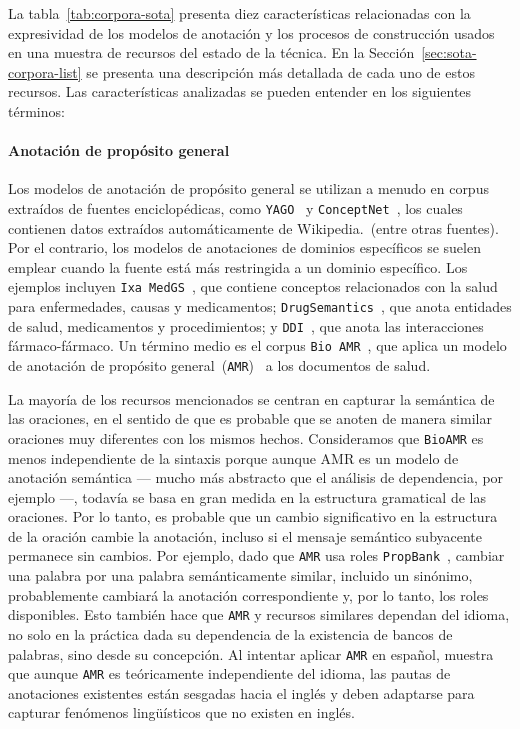 La tabla~\ref{tab:corpora-sota} presenta diez características relacionadas con la expresividad de los modelos de anotación y los procesos de construcción usados en una muestra de recursos del estado de la técnica.
En la Sección~\ref{sec:sota-corpora-list} se presenta una descripción más detallada de cada uno de estos recursos.
Las características analizadas se pueden entender en los siguientes términos:

\paragraph{Anotación de propósito general}

Los modelos de anotación de propósito general se utilizan a menudo en corpus extraídos de fuentes enciclopédicas, como \texttt{YAGO}~\cite{suchanek2007yago} y \texttt{ConceptNet}~\cite{speer2017conceptnet}, los cuales contienen datos extraídos automáticamente de Wikipedia.~(entre otras fuentes). Por el contrario, los modelos de anotaciones de dominios específicos se suelen emplear cuando la fuente está más restringida a un dominio específico. Los ejemplos incluyen \texttt{Ixa MedGS}~\cite{ORONOZ2015318}, que contiene conceptos relacionados con la salud para enfermedades, causas y medicamentos; \texttt{DrugSemantics}~\cite{moreno2017drugsemantics}, que anota entidades de salud, medicamentos y procedimientos; y \texttt{DDI}~\cite{herrero2013ddi}, que anota las interacciones fármaco-fármaco. Un término medio es el corpus \texttt{Bio AMR}~\cite{bioamr}, que aplica un modelo de anotación de propósito general~(\texttt{AMR})~\cite{banarescu2013abstract} a los documentos de salud.

La mayoría de los recursos mencionados se centran en capturar la semántica de las oraciones, en el sentido de que es probable que se anoten de manera similar oraciones muy diferentes con los mismos hechos. Consideramos que \texttt{BioAMR} es menos independiente de la sintaxis porque aunque AMR es un modelo de anotación semántica --- mucho más abstracto que el análisis de dependencia, por ejemplo ---, todavía se basa en gran medida en la estructura gramatical de las oraciones. Por lo tanto, es probable que un cambio significativo en la estructura de la oración cambie la anotación, incluso si el mensaje semántico subyacente permanece sin cambios. Por ejemplo, dado que \texttt{AMR} usa roles \texttt{PropBank}~\cite{propbank}, cambiar una palabra por una palabra semánticamente similar, incluido un sinónimo, probablemente cambiará la anotación correspondiente y, por lo tanto, los roles disponibles.
Esto también hace que \texttt{AMR} y recursos similares dependan del idioma, no solo en la práctica dada su dependencia de la existencia de bancos de palabras, sino desde su concepción. Al intentar aplicar \texttt{AMR} en español, \citet{migueles2018annotating} muestra que aunque \texttt{AMR} es teóricamente independiente del idioma, las pautas de anotaciones existentes están sesgadas hacia el inglés y deben adaptarse para capturar fenómenos lingüísticos que no existen en inglés.

